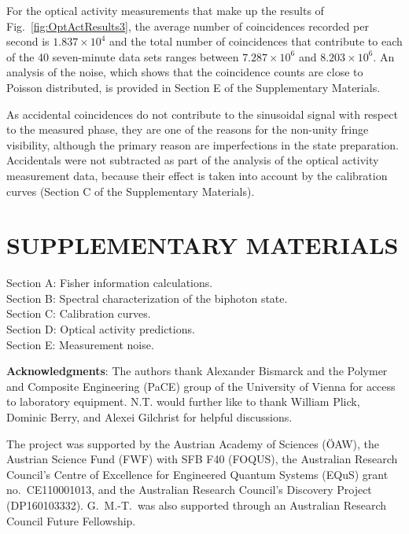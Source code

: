 \documentclass[12pt,preprint]{revtex4}
\begin{document}
For the optical activity measurements that make up the results of Fig.\ \ref{fig:OptActResults3}, the average number of coincidences recorded per second is $1.837\times 10^4$ and the total number of coincidences that contribute to each of the 40 seven-minute data sets ranges between $7.287\times 10^6$  and $8.203\times 10^6$. An analysis of the noise, which shows that the coincidence counts are close to Poisson distributed, is provided in Section E of the Supplementary Materials. 

As accidental coincidences do not contribute to the sinusoidal signal with respect to the measured phase, they are one of the reasons for the non-unity fringe visibility, although the primary reason are imperfections in the state preparation. Accidentals were not subtracted as part of the analysis of the optical activity measurement data, because their effect is taken into account by the calibration curves (Section C of the Supplementary Materials). 

\nocite{Crespi2012}
\nocite{Lowry1924}

\section*{SUPPLEMENTARY MATERIALS} \nonumber \label{SIlist}
\noindent Section A: Fisher information calculations.\\
Section B: Spectral characterization of the biphoton state.\\
Section C: Calibration curves.\\
Section D: Optical activity predictions.\\
Section E: Measurement noise.


%
%




\vspace{1cm}

\noindent \textbf{Acknowledgments}: The authors thank Alexander Bismarck and the Polymer and Composite Engineering (PaCE) group of the University of Vienna for access to laboratory equipment. N.T. would further like to thank William Plick, Dominic Berry, and Alexei Gilchrist for helpful discussions.  

\noindent The project was supported by the Austrian Academy of Sciences (\"{O}AW), the Austrian Science Fund (FWF) with SFB F40 (FOQUS), the Australian Research Council's Centre of Excellence for Engineered Quantum
Systems (EQuS) grant no.\ CE110001013, and the Australian Research Council's Discovery
Project (DP160103332). G.\ M.-T.\ was also supported through an Australian Research Council Future Fellowship.
\end{document}
